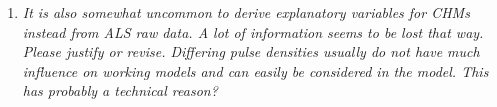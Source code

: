 \documentclass{article}
\begin{document}
\begin{enumerate}
{}	
  

  
  
  
  \item \textit{It is also somewhat uncommon to derive explanatory variables for CHMs instead from ALS raw data. A lot of information seems to be lost that way. Please justify or revise. Differing pulse densities usually do not have much influence on working models and can easily be considered in the model. This has probably a technical reason?}
  

\end{enumerate}
\end{document}
